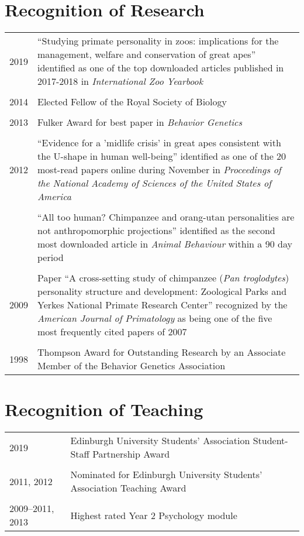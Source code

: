 \documentclass[11pt]{article}
\begin{document}
\section*{Recognition of Research}
\begin{tabular}{p{3cm}p{12cm}}
2019 &  ``Studying primate personality in zoos: implications for the
management, welfare and conservation of great apes'' identified as one
of the top downloaded articles published in 2017-2018 in
\textit{International Zoo Yearbook} \\ \\

2014 & Elected Fellow of the Royal Society of Biology \\ \\

2013 & Fulker Award for best paper in \textit{Behavior Genetics} \\ \\

2012 & ``Evidence for a 'midlife crisis' in great apes consistent with
the U-shape in human well-being'' identified as one of the 20
most-read papers online during November in \textit{Proceedings of the National Academy of
Sciences of the United States of America} \\ \\

& ``All too human? Chimpanzee and orang-utan personalities are
not anthropomorphic projections'' identified as the second most
downloaded article in \textit{Animal Behaviour} within a 90 day period
\\ \\

2009 & Paper ``A cross-setting study of chimpanzee (\textit{Pan
troglodytes}) personality structure and development: Zoological
Parks and Yerkes National Primate Research Center'' recognized by the
\textit{American Journal of Primatology} as being one of the five most
frequently cited papers of 2007 \\ \\

1998 & Thompson Award for Outstanding
Research by an Associate Member of the Behavior Genetics Association
\end{tabular}

\section*{Recognition of Teaching}
\begin{tabular}{p{3cm}p{12cm}}
2019 & Edinburgh University Students' Association Student-Staff
Partnership Award \\ \\

2011, 2012 & Nominated for Edinburgh University Students' Association
Teaching Award \\ \\

2009--2011, 2013 & Highest rated Year 2 Psychology module 
\end{tabular}
\end{document}
